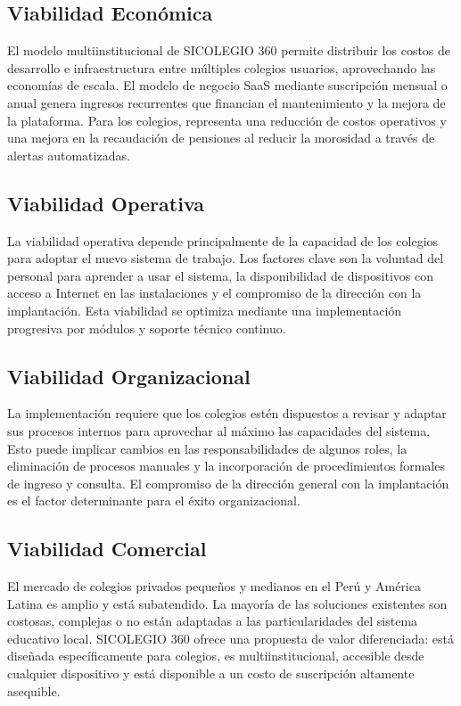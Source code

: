 \documentclass[12pt,a4paper,oneside]{report}
\begin{document}
\subsection{Viabilidad Económica}
El modelo multiinstitucional de SICOLEGIO 360 permite distribuir los costos de desarrollo e infraestructura entre múltiples colegios usuarios, aprovechando las economías de escala. El modelo de negocio SaaS mediante suscripción mensual o anual genera ingresos recurrentes que financian el mantenimiento y la mejora de la plataforma. Para los colegios, representa una reducción de costos operativos y una mejora en la recaudación de pensiones al reducir la morosidad a través de alertas automatizadas.

\subsection{Viabilidad Operativa}
La viabilidad operativa depende principalmente de la capacidad de los colegios para adoptar el nuevo sistema de trabajo. Los factores clave son la voluntad del personal para aprender a usar el sistema, la disponibilidad de dispositivos con acceso a Internet en las instalaciones y el compromiso de la dirección con la implantación. Esta viabilidad se optimiza mediante una implementación progresiva por módulos y soporte técnico continuo.

\subsection{Viabilidad Organizacional}
La implementación requiere que los colegios estén dispuestos a revisar y adaptar sus procesos internos para aprovechar al máximo las capacidades del sistema. Esto puede implicar cambios en las responsabilidades de algunos roles, la eliminación de procesos manuales y la incorporación de procedimientos formales de ingreso y consulta. El compromiso de la dirección general con la implantación es el factor determinante para el éxito organizacional.

\subsection{Viabilidad Comercial}
El mercado de colegios privados pequeños y medianos en el Perú y América Latina es amplio y está subatendido. La mayoría de las soluciones existentes son costosas, complejas o no están adaptadas a las particularidades del sistema educativo local. SICOLEGIO 360 ofrece una propuesta de valor diferenciada: está diseñada específicamente para colegios, es multiinstitucional, accesible desde cualquier dispositivo y está disponible a un costo de suscripción altamente asequible.
\end{document}
